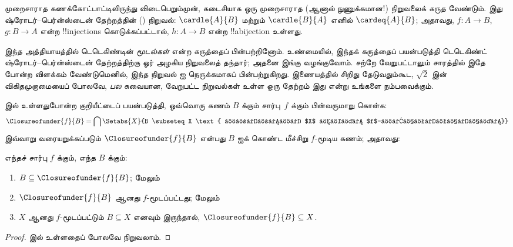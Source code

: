 \documentclass[../../../include/open-logic-section]{subfiles}
\begin{document}


முறைசாராத கணக்கோட்பாட்டிலிருந்து விடைபெறும்முன், கடைசியாக ஒரு
முறைசாராத (ஆனால் நுணுக்கமான!{}) நிறுவலைக் கருத வேண்டும்.
இது ஷ்ரோடர்--பெர்ன்ஸ்டைன் தேற்றத்தின்
() நிறுவல்:
$\cardle{A}{B}$ மற்றும் $\cardle{B}{A}$ எனில் $\cardeq{A}{B}$;
அதாவது, $f \colon A \to B$, $g \colon B \to A$ என்ற
!!{injection}s கொடுக்கப்பட்டால், $h \colon A \to B$ என்ற
!!a{bijection} உள்ளது.

இந்த அத்தியாயத்தில் டெடெகிண்டின் \emph{மூடல்கள்} என்ற கருத்தைப்
பின்பற்றினோம். உண்மையில், இந்தக் கருத்தைப் பயன்படுத்தி டெடெகிண்ட்
ஷ்ரோடர்--பெர்ன்ஸ்டைன் தேற்றத்திற்கு ஓர் அழகிய நிறுவலைத் தந்தார்;
அதனை இங்கு வழங்குவோம். சற்றே வேறுபட்டாலும் சாரத்தில் இதே போன்ற
விளக்கம் வேண்டுமெனில், இந்த நிறுவல் \citet[pp.~157--8]{Potter2004} ஐ
நெருக்கமாகப் பின்பற்றுகிறது. இணையத்தில் சிறிது தேடுவதும்கூட,
$\sqrt{2}$ இன் விகிதமுறாமையைப் போலவே, \emph{பல} சுவையான,
வேறுபட்ட நிறுவல்கள் உள்ள ஒரு தேற்றம் இது என்று உங்களை நம்பவைக்கும்.

 இல் உள்ளதுபோன்ற குறியீட்டைப்
பயன்படுத்தி, ஒவ்வொரு கணம் $B$ க்கும் சார்பு~$f$ க்கும்
பின்வருமாறு கொள்க:
\[
\Closureofunder{f}{B} = \bigcap \Setabs{X}{B \subseteq X
\text{ மற்றும் $X$ ஆனது $f$-மூடப்பட்டது}}
\]
இவ்வாறு வரையறுக்கப்படும் $\Closureofunder{f}{B}$ என்பது $B$ ஐக்
கொண்ட மீச்சிறு $f$-மூடிய கணம்; அதாவது:

\begin{lem}
	எந்தச் சார்பு $f$ க்கும், எந்த $B$ க்கும்:
	\begin{enumerate}
		\item{} $B \subseteq \Closureofunder{f}{B}$; மேலும்
		\item{} $\Closureofunder{f}{B}$ ஆனது $f$-மூடப்பட்டது; மேலும்
		\item{} $X$ ஆனது $f$-மூடப்பட்டும் $B
		\subseteq X$ எனவும் இருந்தால், $\Closureofunder{f}{B} \subseteq X$.
	\end{enumerate}
\end{lem}

\begin{proof}
 இல் உள்ளதைப்
போலவே நிறுவலாம்.
\end{proof}
\end{document}
